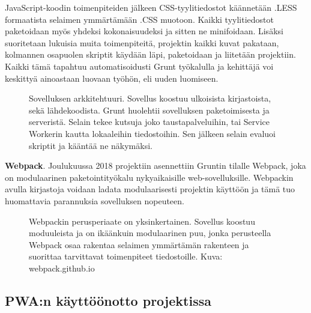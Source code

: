 \documentclass{tktltiki}
\begin{document}
JavaScript-koodin toimenpiteiden jälkeen CSS-tyylitiedostot käännetään .LESS formaatista selaimen ymmärtämään .CSS muotoon. Kaikki tyylitiedostot paketoidaan myös yhdeksi kokonaisuudeksi ja sitten ne minifoidaan. Lisäksi suoritetaan lukuisia muita toimenpiteitä, projektin kaikki kuvat pakataan, kolmannen osapuolen skriptit käydään läpi, paketoidaan ja liitetään projektiin. Kaikki tämä tapahtuu automatisoidusti Grunt työkalulla ja kehittäjä voi keskittyä ainoastaan luovaan työhön, eli uuden luomiseen.

\begin{figure}[h]
\begin{center}
\caption{Sovelluksen arkkitehtuuri. Sovellus koostuu ulkoisista kirjastoista, sekä lähdekoodista. Grunt huolehtii sovelluksen paketoimisesta ja serveristä. Selain tekee kutsuja joko taustapalveluihin, tai Service Workerin kautta lokaaleihin tiedostoihin. Sen jälkeen selain evaluoi skriptit ja kääntää ne näkymäksi.}
\label{angulararkkitehtuuri}
\end{center}
\end{figure}

\textbf{Webpack}. Joulukuussa 2018 projektiin asennettiin Gruntin tilalle Webpack, joka on modulaarinen paketointityökalu nykyaikaisille web-sovelluksille. Webpackin avulla kirjastoja voidaan ladata modulaarisesti projektin käyttöön ja tämä tuo huomattavia parannuksia sovelluksen nopeuteen. 

\begin{figure}[h]
\begin{center}
\caption{Webpackin perusperiaate on yksinkertainen. Sovellus koostuu moduuleista ja on ikäänkuin modulaarinen puu, jonka perusteella Webpack osaa rakentaa selaimen ymmärtämän rakenteen ja suorittaa tarvittavat toimenpiteet tiedostoille. Kuva: webpack.github.io}
\label{whatiswebpack}
\end{center}
\end{figure}



\subsection{PWA:n käyttöönotto projektissa}
\end{document}
